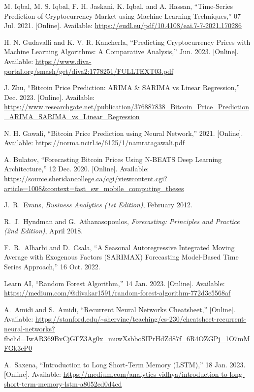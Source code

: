 \documentclass{ieeeojies}
\begin{document}
\begin{thebibliography}{00}
	
	M. Iqbal, M. S. Iqbal, F. H. Jaskani, K. Iqbal, and A. Hassan, ``Time-Series Prediction of Cryptocurrency Market using Machine Learning Techniques,'' 07 Jul. 2021. [Online]. Available: \url{https://eudl.eu/pdf/10.4108/eai.7-7-2021.170286}
	
	H. N. Gudavalli and K. V. R. Kancherla, ``Predicting Cryptocurrency Prices with Machine Learning Algorithms: A Comparative Analysis,'' Jun. 2023. [Online]. Available: \url{https://www.diva-portal.org/smash/get/diva2:1778251/FULLTEXT03.pdf}
	
	J. Zhu, ``Bitcoin Price Prediction: ARIMA \& SARIMA vs Linear Regression,'' Dec. 2023. [Online]. Available: \url{https://www.researchgate.net/publication/376887838_Bitcoin_Price_Prediction_ARIMA_SARIMA_vs_Linear_Regression}
	
	N. H. Gawali, ``Bitcoin Price Prediction using Neural Network,'' 2021. [Online]. Available: \url{https://norma.ncirl.ie/6125/1/namratagawali.pdf}
	
	A. Bulatov, ``Forecasting Bitcoin Prices Using N-BEATS Deep Learning Architecture,'' 12 Dec. 2020. [Online]. Available: \url{https://source.sheridancollege.ca/cgi/viewcontent.cgi?article=1008&context=fast_sw_mobile_computing_theses}
	
	J.~R.~Evans, \textit{Business Analytics (1st Edition)}, February 2012.
	
	R.~J.~Hyndman and G.~Athanasopoulos, \textit{Forecasting: Principles and Practice (2nd Edition)}, April 2018.
	
	F.~R.~Alharbi and D.~Csala, ``A Seasonal Autoregressive Integrated Moving Average with Exogenous Factors (SARIMAX) Forecasting Model-Based Time Series Approach,'' 16 Oct. 2022.
	
	Learn AI, ``Random Forest Algorithm,'' 14 Jan. 2023. [Online]. Available: \url{https://medium.com/@divakar1591/random-forest-algorithm-772d3e5568af}
	
	A.~Amidi and S.~Amidi, ``Recurrent Neural Networks Cheatsheet,'' [Online]. Available: \url{https://stanford.edu/~shervine/teaching/cs-230/cheatsheet-recurrent-neural-networks?fbclid=IwAR369BvCjGFZ3Ag0x_muwXsbboSIPrHdZd87f_6R4OZGPj_1O7mMFGk3eP0}
	
	A.~Saxena, ``Introduction to Long Short-Term Memory (LSTM),'' 18 Jan. 2023. [Online]. Available: \url{https://medium.com/analytics-vidhya/introduction-to-long-short-term-memory-lstm-a8052cd0d4cd}
	

\end{thebibliography}
\end{document}
